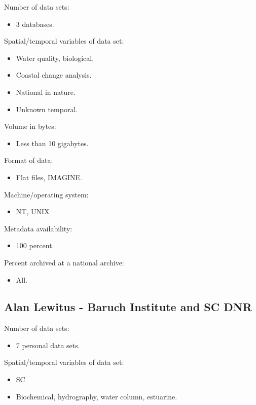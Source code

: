 Number of data sets:
\begin{itemize}
  \item 3 databases.
\end{itemize}

Spatial/temporal variables of data set:
\begin{itemize}
  \item Water quality, biological.
  \item Coastal change analysis.
  \item National in nature.
  \item Unknown temporal.
\end{itemize}

Volume in bytes:
\begin{itemize}
  \item Less than 10 gigabytes.
\end{itemize}

Format of data:
\begin{itemize}
  \item Flat files, IMAGINE.
\end{itemize}

Machine/operating system:
\begin{itemize}
  \item NT, UNIX
\end{itemize}

Metadata availability:
\begin{itemize}
  \item 100 percent.
\end{itemize}

Percent archived at a national archive:
\begin{itemize}
  \item All.
\end{itemize}

\subsection{Alan Lewitus - Baruch Institute and SC DNR}

Number of data sets:
\begin{itemize}
  \item 7 personal data sets.
\end{itemize}

Spatial/temporal variables of data set:
\begin{itemize}
  \item SC
  \item Biochemical, hydrography, water column, estuarine.
\end{itemize}


